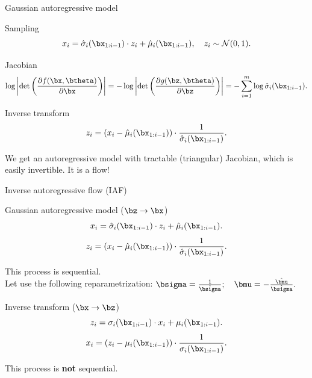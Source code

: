 \begin{frame}{Gaussian autoregressive model}
	\begin{block}{Sampling}
		\vspace{-0.5cm}
		\[
		x_i = \hat{\sigma}_i (\bx_{1:i-1}) \cdot z_i + \hat{\mu}_i(\bx_{1:i-1}), \quad z_i \sim \mathcal{N}(0, 1).
		\]
		\vspace{-0.5cm}
	\end{block}
	\begin{block}{Jacobian}
		\vspace{-0.5cm}
		\[
		\log \left|\det \left( \frac{\partial f(\bx, \btheta)}{\partial \bx} \right) \right| = -\log \left|\det \left( \frac{\partial g(\bz, \btheta)}{\partial \bz} \right) \right| = - \sum_{i = 1}^m \log \hat{\sigma}_i (\bx_{1:i-1}).
		\]
		\vspace{-0.5cm}
	\end{block} 
	\begin{block}{Inverse transform}
		\vspace{-0.5cm}
		\[
		z_i = \left(x_i - \hat{\mu}_i(\bx_{1:i-1}) \right) \cdot \frac{1}{\hat{\sigma}_i (\bx_{1:i-1}) }.
		\]
	\end{block}
	We get an autoregressive model with tractable (triangular) Jacobian, which is easily invertible. It is a flow!
\end{frame}
\begin{frame}{Inverse autoregressive flow (IAF)}
	
	\begin{block}{Gaussian autoregressive model ($\bz \rightarrow \bx$)}
		\vspace{-0.2cm}
		\[
			x_i = \hat{\sigma}_i (\bx_{1:i-1}) \cdot z_i + \hat{\mu}_i(\bx_{1:i-1}).
		\]
		\[
			z_i = \left(x_i - \hat{\mu}_i(\bx_{1:i-1}) \right) \cdot \frac{1}{ \hat{\sigma}_i (\bx_{1:i-1})}.
		\]
		\vspace{-0.3cm}
	\end{block}
	This process is sequential. \\
	Let use the following reparametrization:
	$\bsigma = \frac{1}{\hat{\bsigma}}; \quad \bmu = - \frac{\hat{\bmu}}{\hat{\bsigma}}.$
	
	\begin{block}{Inverse transform ($\bx \rightarrow \bz$)}
		\vspace{-0.2cm}
		\[
			z_i = \sigma_i (\bx_{1:i-1}) \cdot x_i + \mu_i(\bx_{1:i-1}).
		\]
		\[
			x_i = \left( z_i - \mu_i(\bx_{1:i-1})\right) \cdot \frac{1}{\sigma_i (\bx_{1:i-1}) }.
		\]
		\vspace{-0.3cm}
	\end{block}
	This process is \textbf{not} sequential.
\end{frame}
